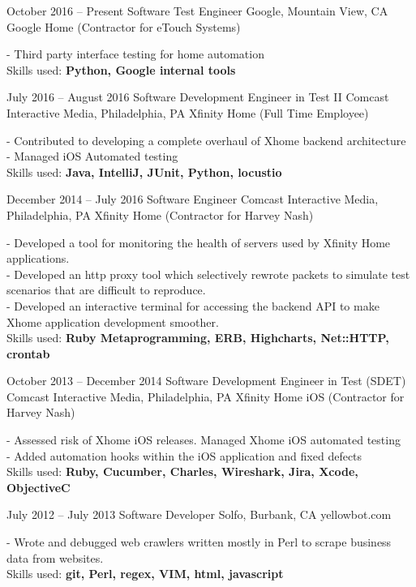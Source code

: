 \documentclass[oldfontcommands]{tccv}
\begin{document}
\begin{eventlist}
\item{October 2016 -- Present}
     {Software Test Engineer}
     {Google, Mountain View, CA}
     {Google Home (Contractor for eTouch Systems)}

- Third party interface testing for home automation \\
Skills used: \textbf{Python, Google internal tools}

\item{July 2016 -- August 2016}
     {Software Development Engineer in Test II}
     {Comcast Interactive Media, Philadelphia, PA}
     {Xfinity Home (Full Time Employee)}

- Contributed to developing a complete overhaul of Xhome backend architecture \\
- Managed iOS Automated testing \\
Skills used: \textbf{Java, IntelliJ, JUnit, Python, locustio}

\item{December 2014 -- July 2016}
     {Software Engineer}
     {Comcast Interactive Media, Philadelphia, PA}
     {Xfinity Home (Contractor for Harvey Nash)}

- Developed a tool for monitoring the health of servers used by Xfinity Home applications. \\
- Developed an http proxy tool which selectively rewrote packets to simulate test scenarios that are difficult to reproduce. \\
- Developed an interactive terminal for accessing the backend API to make Xhome application development smoother. \\
Skills used: \textbf{Ruby Metaprogramming, ERB, Highcharts, Net::HTTP, crontab}

\item{October 2013 -- December 2014}
     {Software Development Engineer in Test (SDET)}
     {Comcast Interactive Media, Philadelphia, PA}
     {Xfinity Home iOS (Contractor for Harvey Nash)}

- Assessed risk of Xhome iOS releases. Managed Xhome iOS automated testing \\
- Added automation hooks within the iOS application and fixed defects \\
Skills used: \textbf{Ruby, Cucumber, Charles, Wireshark, Jira, Xcode, ObjectiveC}

\item{July 2012 -- July 2013}
     {Software Developer}
     {Solfo, Burbank, CA}
     {yellowbot.com}

- Wrote and debugged web crawlers written mostly in Perl to scrape business data from websites. \\
Skills used: \textbf{git, Perl, regex, VIM, html, javascript}

\end{eventlist}
\end{document}
